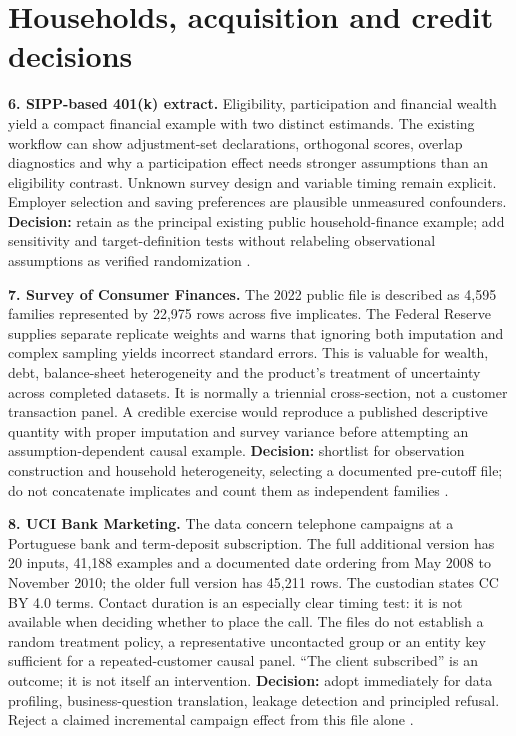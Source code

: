 \hypertarget{households-acquisition-and-credit-decisions}{%
\section{Households, acquisition and credit
decisions}\label{households-acquisition-and-credit-decisions}}

\textbf{6. SIPP-based 401(k) extract.} Eligibility, participation and
financial wealth yield a compact financial example with two distinct
estimands. The existing workflow can show adjustment-set declarations,
orthogonal scores, overlap diagnostics and why a participation effect
needs stronger assumptions than an eligibility contrast. Unknown survey
design and variable timing remain explicit. Employer selection and
saving preferences are plausible unmeasured confounders.
\textbf{Decision:} retain as the principal existing public
household-finance example; add sensitivity and target-definition tests
without relabeling observational assumptions as verified randomization
\citep{public401k}.

\textbf{7. Survey of Consumer Finances.} The 2022 public file is
described as 4,595 families represented by 22,975 rows across five
implicates. The Federal Reserve supplies separate replicate weights and
warns that ignoring both imputation and complex sampling yields
incorrect standard errors. This is valuable for wealth, debt,
balance-sheet heterogeneity and the product's treatment of uncertainty
across completed datasets. It is normally a triennial cross-section, not
a customer transaction panel. A credible exercise would reproduce a
published descriptive quantity with proper imputation and survey
variance before attempting an assumption-dependent causal example.
\textbf{Decision:} shortlist for observation construction and household
heterogeneity, selecting a documented pre-cutoff file; do not
concatenate implicates and count them as independent families
\citep{pd15_scf}.

\textbf{8. UCI Bank Marketing.} The data concern telephone campaigns at
a Portuguese bank and term-deposit subscription. The full additional
version has 20 inputs, 41,188 examples and a documented date ordering
from May 2008 to November 2010; the older full version has 45,211 rows.
The custodian states CC BY 4.0 terms. Contact duration is an especially
clear timing test: it is not available when deciding whether to place
the call. The files do not establish a random treatment policy, a
representative uncontacted group or an entity key sufficient for a
repeated-customer causal panel. ``The client subscribed'' is an outcome;
it is not itself an intervention. \textbf{Decision:} adopt immediately
for data profiling, business-question translation, leakage detection and
principled refusal. Reject a claimed incremental campaign effect from
this file alone \citep{pd15_uci_bank,pd15_profile}.

